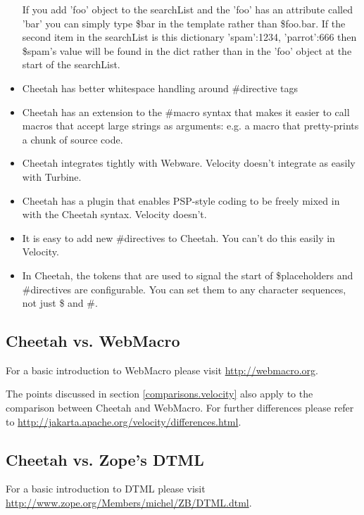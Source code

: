 \begin{itemize}
     If you add 'foo' object to the searchList and the 'foo' has an attribute
     called 'bar' you can simply type \$bar in the template rather than \$foo.bar.
     If the second item in the searchList is this dictionary {'spam':1234,
       'parrot':666} then \$spam's value will be found in the dict rather than in
     the 'foo' object at the start of the searchList.

\item Cheetah has better whitespace handling around \#directive tags
\item Cheetah has an extension to the \#macro syntax that makes it easier to call
     macros that accept large strings as arguments: e.g. a macro that
     pretty-prints a chunk of source code.
\item Cheetah integrates tightly with Webware.  Velocity doesn't integrate as easily
     with Turbine.
\item Cheetah has a plugin that enables PSP-style coding to be freely mixed in with
     the Cheetah syntax. Velocity doesn't.
\item It is easy to add new \#directives to Cheetah. You can't do this easily in
     Velocity.
\item In Cheetah, the tokens that are used to signal the start of \$placeholders and
     \#directives are configurable. You can set them to any character sequences,
     not just \$ and \#.
\end{itemize}


\subsection{Cheetah vs. WebMacro}
\label{comparisons.webmacro}

For a basic introduction to WebMacro please visit
\url{http://webmacro.org}.

The points discussed in section \ref{comparisons.velocity} also apply to the
comparison between Cheetah and WebMacro.  For further differences please refer
to \url{http://jakarta.apache.org/velocity/differences.html}.

\subsection{Cheetah vs. Zope's DTML}
\label{comparisons.dtml}

For a basic introduction to DTML please visit
\url{http://www.zope.org/Members/michel/ZB/DTML.dtml}.

